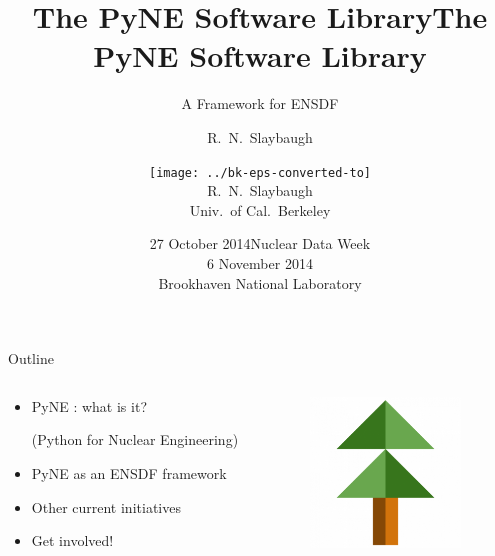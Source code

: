 \documentclass[xcolor=x11names,compress]{beamer}
\title{The PyNE Software Library}
\author{R.\ N.\ Slaybaugh}
\date{27 October 2014}
\renewcommand{\(}{\begin{columns}}
\renewcommand{\)}{\end{columns}}
\newcommand{\<}[1]{\begin{column}{#1}}
\renewcommand{\>}{\end{column}}
\begin{document}
\begin{frame}
\title{The PyNE Software Library}
\subtitle{A Framework for ENSDF}
\author{
        \texttt{[image: ../bk-eps-converted-to]}\\R.\ N.\ Slaybaugh \\ Univ.\ of Cal.\ Berkeley}

\date{Nuclear Data Week\\ 6 November 2014\\ Brookhaven National Laboratory}
\titlepage
\end{frame}

\begin{frame}{Outline}

	\begin{columns}
  	\begin{column}{0.5\textwidth}
	    \begin{itemize}
        \item PyNE \cite{pyne}: what is it?
        
        (Python for Nuclear Engineering)
        \item PyNE as an ENSDF framework
        \item Other current initiatives
        \item Get involved!
	    \end{itemize}
  	\end{column}
 	\begin{column}{0.4\textwidth}
 	   \begin{center}
 	   \begin{figure}
       \includegraphics[height=4cm]{../figs/pyne-icon-big}
	   \end{figure}
 	   \end{center}
  	\end{column}
	\end{columns}

\end{frame}
\end{document}
